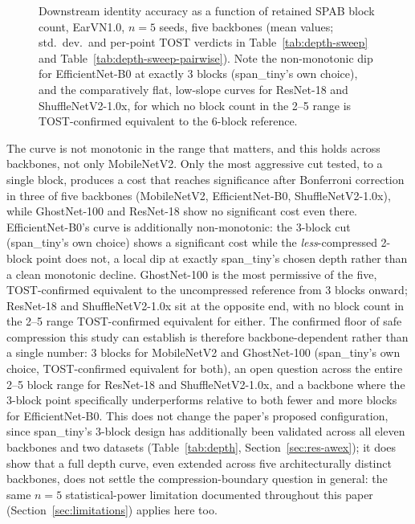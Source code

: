 \documentclass[pdflatex,sn-vancouver-num]{sn-jnl}
\begin{document}
\begin{figure}[htbp]
\caption{Downstream identity accuracy as a function of retained SPAB block count, EarVN1.0, $n=5$ seeds, five backbones (mean values; std.\ dev.\ and per-point TOST verdicts in Table~\ref{tab:depth-sweep} and Table~\ref{tab:depth-sweep-pairwise}). Note the non-monotonic dip for EfficientNet-B0 at exactly 3 blocks (span\_tiny's own choice), and the comparatively flat, low-slope curves for ResNet-18 and ShuffleNetV2-1.0x, for which no block count in the 2--5 range is TOST-confirmed equivalent to the 6-block reference.}
\label{fig:depth-sweep}
\end{figure}

The curve is not monotonic in the range that matters, and this holds across backbones, not only MobileNetV2. Only the most aggressive cut tested, to a single block, produces a cost that reaches significance after Bonferroni correction in three of five backbones (MobileNetV2, EfficientNet-B0, ShuffleNetV2-1.0x), while GhostNet-100 and ResNet-18 show no significant cost even there. EfficientNet-B0's curve is additionally non-monotonic: the 3-block cut (span\_tiny's own choice) shows a significant cost while the \emph{less}-compressed 2-block point does not, a local dip at exactly span\_tiny's chosen depth rather than a clean monotonic decline. GhostNet-100 is the most permissive of the five, TOST-confirmed equivalent to the uncompressed reference from 3 blocks onward; ResNet-18 and ShuffleNetV2-1.0x sit at the opposite end, with no block count in the 2--5 range TOST-confirmed equivalent for either. The confirmed floor of safe compression this study can establish is therefore backbone-dependent rather than a single number: 3 blocks for MobileNetV2 and GhostNet-100 (span\_tiny's own choice, TOST-confirmed equivalent for both), an open question across the entire 2--5 block range for ResNet-18 and ShuffleNetV2-1.0x, and a backbone where the 3-block point specifically underperforms relative to both fewer and more blocks for EfficientNet-B0. This does not change the paper's proposed configuration, since span\_tiny's 3-block design has additionally been validated across all eleven backbones and two datasets (Table~\ref{tab:depth}, Section~\ref{sec:res-awex}); it does show that a full depth curve, even extended across five architecturally distinct backbones, does not settle the compression-boundary question in general: the same $n=5$ statistical-power limitation documented throughout this paper (Section~\ref{sec:limitations}) applies here too.
\end{document}
